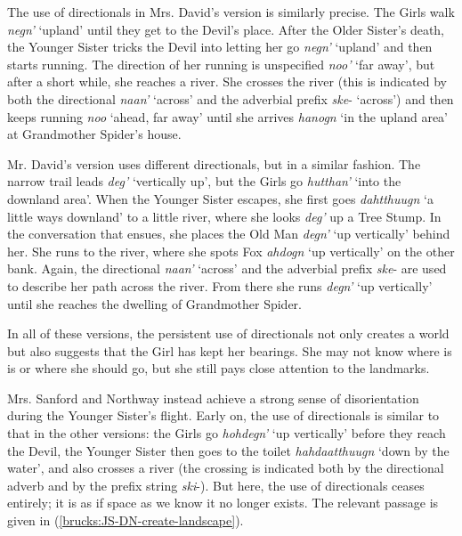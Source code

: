 The use of directionals in Mrs. David's version is similarly precise. The Girls walk {\em negn'} `upland' until they get to the Devil's place. After the Older Sister's death, the Younger Sister tricks the Devil into letting her go {\em negn'} `upland' and then starts running. The direction of her running is unspecified {\em noo'} `far away', but after a short while, she reaches a river. She crosses the river (this is indicated by both the directional {\em naan'} `across' and the adverbial prefix {\em ske}- `across') and then keeps running {\em noo} `ahead, far away' until she arrives \textit{hanogn} `in the upland area' at Grandmother Spider's house.

Mr. David's version uses different directionals, but in a similar fashion. The narrow trail leads {\em deg'} `vertically up', but the Girls go {\em hutthan'} `into the downland area'. When the Younger Sister escapes, she first goes {\em dahtthuugn} `a little ways downland' to a little river, where she looks {\em deg'} up a Tree Stump. In the conversation that ensues, she places the Old Man {\em degn'} `up vertically' behind her. She runs to the river, where she spots Fox {\em ahdogn} `up vertically' on the other bank. Again, the directional {\em naan'} `across' and the adverbial prefix {\em ske}- are used to describe her path across the river. From there she runs {\em degn'} `up vertically' until she reaches the dwelling of Grandmother Spider.

In all of these versions, the persistent use of directionals not only creates a world but also suggests that the Girl has kept her bearings. She may not know where is is or where she should go, but she still pays close attention to the landmarks.

Mrs. Sanford and Northway instead achieve a strong sense of disorientation during the Younger Sister's flight. Early on, the use of directionals is similar to that in the other versions: the Girls go {\em hohdegn'} `up vertically' before they reach the Devil, the Younger Sister then goes to the toilet {\em hahdaatthuugn} `down by the water', and also crosses a river (the crossing is indicated both by the directional adverb and by the prefix string {\em ski}-). But here, the use of directionals ceases entirely; it is as if space as we know it no longer exists. The relevant passage is given in (\ref{brucks:JS-DN-create-landscape}).

